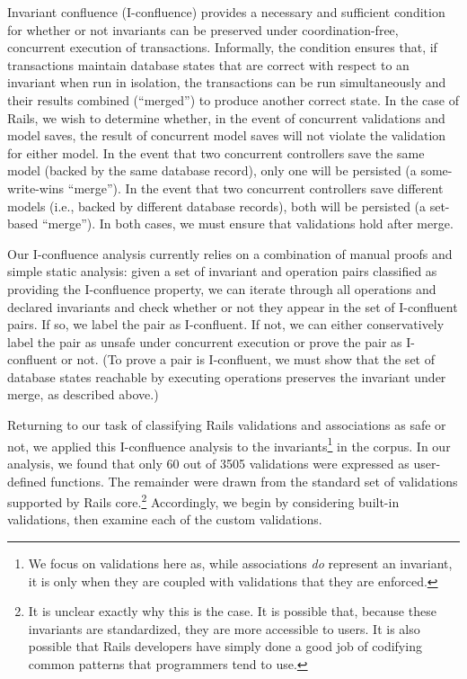 Invariant confluence (I-confluence) provides a necessary and
sufficient condition for whether or not invariants can be preserved
under coordination-free, concurrent execution of
transactions. Informally, the condition ensures that, if transactions
maintain database states that are correct with respect to an invariant
when run in isolation, the transactions can be run simultaneously and
their results combined (``merged'') to produce another correct
state. In the case of Rails, we wish to determine whether, in the
event of concurrent validations and model saves, the result of
concurrent model saves will not violate the validation for either
model. In the event that two concurrent controllers save the same
model (backed by the same database record), only one will be persisted
(a some-write-wins ``merge''). In the event that two concurrent
controllers save different models (i.e., backed by different database
records), both will be persisted (a set-based ``merge''). In both
cases, we must ensure that validations hold after merge.

Our I-confluence analysis currently relies on a combination of manual
proofs and simple static analysis: given a set of invariant and
operation pairs classified as providing the I-confluence property, we
can iterate through all operations and declared invariants and check
whether or not they appear in the set of I-confluent pairs. If so, we
label the pair as I-confluent. If not, we can either conservatively
label the pair as unsafe under concurrent execution or prove the pair
as I-confluent or not. (To prove a pair is I-confluent, we must show
that the set of database states reachable by executing operations
preserves the invariant under merge, as described above.)

Returning to our task of classifying Rails validations and
associations as safe or not, we applied this I-confluence analysis to
the invariants\footnote{We focus on validations here as, while
  associations \textit{do} represent an invariant, it is only when
  they are coupled with validations that they are enforced.} in the
corpus. In our analysis, we
found that only 60 out of 3505 validations were expressed as
user-defined functions. The remainder were drawn from the standard set
of validations supported by Rails core.\footnote{It is unclear exactly
  why this is the case. It is possible that, because these invariants
  are standardized, they are more accessible to users. It is also
  possible that Rails developers have simply done a good job of
  codifying common patterns that programmers tend to use.}
Accordingly, we begin by considering built-in validations, then
examine each of the custom validations.


